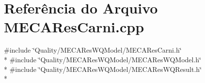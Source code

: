 \section{Referência do Arquivo M\+E\+C\+A\+Res\+Carni.\+cpp}
\label{_m_e_c_a_res_carni_8cpp}
{\ttfamily \#include \char`\"{}Quality/\+M\+E\+C\+A\+Res\+W\+Q\+Model/\+M\+E\+C\+A\+Res\+Carni.\+h\char`\"{}}\\*
{\ttfamily \#include \char`\"{}Quality/\+M\+E\+C\+A\+Res\+W\+Q\+Model/\+M\+E\+C\+A\+Res\+W\+Q\+Model.\+h\char`\"{}}\\*
{\ttfamily \#include \char`\"{}Quality/\+M\+E\+C\+A\+Res\+W\+Q\+Model/\+M\+E\+C\+A\+Res\+W\+Q\+Result.\+h\char`\"{}}\\*
